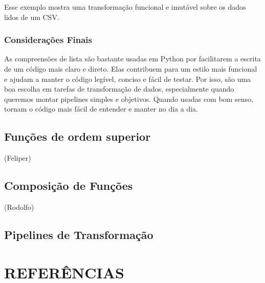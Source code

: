 \documentclass[date,twocolumn,a4paper]{ppgem}
\begin{document}
    Esse exemplo mostra uma transformação funcional e imutável sobre os dados lidos de um CSV.

    \subsubsection{Considerações Finais}
    As compreensões de lista são bastante usadas em Python por facilitarem a escrita de um código mais claro e direto. Elas contribuem para um estilo mais funcional e ajudam a manter o código legível, conciso e fácil de testar. Por isso, são uma boa escolha em tarefas de transformação de dados, especialmente quando queremos montar pipelines simples e objetivos. Quando usadas com bom senso, tornam o código mais fácil de entender e manter no dia a dia.

    \subsection{Funções de ordem superior}
    (Feliper)
    \subsection{Composição de Funções}
    (Rodolfo)
    \subsection{Pipelines de Transformação}

    \section{REFERÊNCIAS}
    
    
\end{document}
